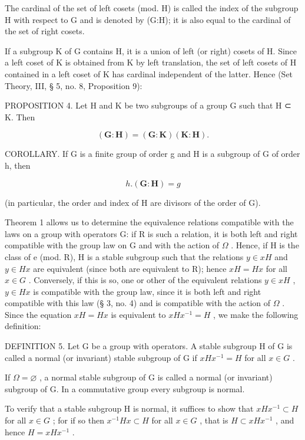 The cardinal of the set of left cosets (mod. H) is called the index of the subgroup H with respect to G and is denoted by (G:H); it is also equal to the cardinal of the set of right cosets.

If a subgroup K of G contains H, it is a union of left (or right) cosets of H. Since a left coset of K is obtained from K by left translation, the set of left cosets of H contained in a left coset of K has cardinal independent of the latter. Hence (Set Theory, III, § 5, no. 8, Proposition 9):

PROPOSITION 4. Let H and K be two subgroups of a group G such that H ⊂ K. Then

\[
(\mathbf {G}: \mathbf {H}) = (\mathbf {G}: \mathbf {K}) (\mathbf {K}: \mathbf {H}).\tag{2}
\]

COROLLARY. If G is a finite group of order g and H is a subgroup of G of order h, then

\[
h. (\mathbf {G}: \mathbf {H}) = g\tag{3}
\]

(in particular, the order and index of H are divisors of the order of G).

Theorem 1 allows us to determine the equivalence relations compatible with the laws on a group with operators G: if R is such a relation, it is both left and right compatible with the group law on G and with the action of \(\Omega\) . Hence, if H is the class of e (mod. R), H is a stable subgroup such that the relations \(y \in xH\) and \(y \in Hx\) are equivalent (since both are equivalent to R); hence \(xH = Hx\) for all \(x \in G\) . Conversely, if this is so, one or other of the equivalent relations \(y \in xH\) , \(y \in Hx\) is compatible with the group law, since it is both left and right compatible with this law (§ 3, no. 4) and is compatible with the action of \(\Omega\) . Since the equation \(xH = Hx\) is equivalent to \(xHx^{-1} = H\) , we make the following definition:

DEFINITION 5. Let G be a group with operators. A stable subgroup H of G is called a normal (or invariant) stable subgroup of G if \(xHx^{-1} = H\) for all \(x \in G\) .

If \(\Omega = \varnothing\) , a normal stable subgroup of G is called a normal (or invariant) subgroup of G. In a commutative group every subgroup is normal.

To verify that a stable subgroup H is normal, it suffices to show that \(xHx^{-1} \subset H\) for all \(x \in G\) ; for if so then \(x^{-1}Hx \subset H\) for all \(x \in G\) , that is \(H \subset xHx^{-1}\) , and hence \(H = xHx^{-1}\) .

